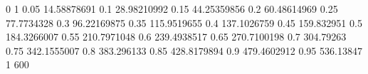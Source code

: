 0    1
0.05 14.58878691
0.1  28.98210992
0.15 44.25359856
0.2  60.48614969
0.25 77.7734328
0.3  96.22169875
0.35 115.9519655
0.4  137.1026759
0.45 159.832951
0.5  184.3266007
0.55 210.7971048
0.6  239.4938517
0.65 270.7100198
0.7  304.79263
0.75 342.1555007
0.8  383.296133
0.85 428.8179894
0.9  479.4602912
0.95 536.13847
1    600